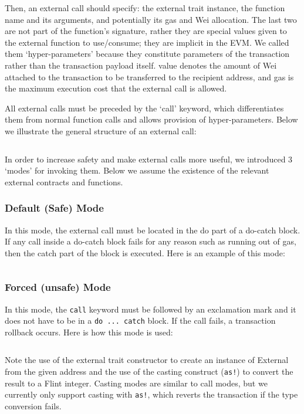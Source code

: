 \inputminted{swift}{code/external-trait.flint}

Then, an external call should specify: the external trait instance, the function name and its arguments, and potentially its gas and Wei allocation. The last two are not part of the function’s signature, rather they are special values given to the external function to use/consume; they are implicit in the EVM. We called them `hyper-parameters' because they constitute parameters of the transaction rather than the transaction payload itself. value denotes the amount of Wei attached to the transaction to be transferred to the recipient address, and gas is the maximum execution cost that the external call is allowed.

All external calls must be preceded by the `call' keyword, which differentiates them from normal function calls and allows provision of hyper-parameters. Below we illustrate the general structure of an external call:

\inputminted{swift}{code/xcall-1.flint}

In order to increase safety and make external calls more useful, we introduced 3 `modes' for invoking them. Below we assume the existence of the relevant external contracts and functions.

\subsubsection{Default (Safe) Mode}

In this mode, the external call must be located in the do part of a do-catch block. If any call inside a do-catch block fails for any reason such as running out of gas, then the catch part of the block is executed. Here is an example of this mode:

\inputminted{swift}{code/xcall-2.flint}

\subsubsection{Forced (unsafe) Mode}

In this mode, the \texttt{call} keyword must be followed by an exclamation mark and it does not have to be in a \texttt{do ... catch} block. If the call fails, a transaction rollback occurs. Here is how this mode is used:

\inputminted{swift}{code/xcall-3.flint}

Note the use of the external trait constructor to create an instance of External from the given address and the use of the casting construct (\texttt{as!}) to convert the result to a Flint integer. Casting modes are similar to call modes, but we currently only support casting with \texttt{as!}, which reverts the transaction if the type conversion fails.

